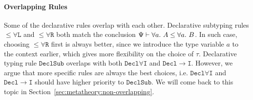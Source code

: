 \paragraph{Overlapping Rules}
Some of the declarative rules overlap with each other.
Declarative subtyping rules $\mathtt{{\le}\forall L}$ and $\mathtt{{\le}\forall R}$
both match the conclusion $\Psi\vdash \all A \le \all B$.
In such case, choosing $\mathtt{{\le}\forall R}$ first is always better,
since we introduce the type variable $a$ to the context earlier,
which gives more flexibility on the choice of $\tau$.
Declarative typing rule $\mathtt{DeclSub}$ overlaps with
both $\mathtt{Decl\forall I}$ and $\mathtt{Decl\to I}$.
However, we argue that more specific rules are always the best choices,
i.e. $\mathtt{Decl\forall I}$ and $\mathtt{Decl\to I}$ should have
higher priority to $\mathtt{DeclSub}$. We will come back to this
topic in Section~\ref{sec:metatheory:non-overlapping}.
\begin{comment}
For example, $\Psi\vdash \lam x \Lto \all a\to a$ succeeds if derived from
Rule $\mathtt{Decl\forall I}$, but fails when applied to $\mathtt{DeclSub}$:
$$
\inferrule*[right={$\mathtt{Decl\forall I}$}]
	{\inferrule*[Right={$\mathtt{Decl\to I}$}]
		{\Psi,a,x:a \vdash x \Lto a}
		{\Psi,a \vdash \lam x \Lto a \to a}
	}
	{\Psi\vdash \lam x \Lto \all a \to a}
$$
$$
\inferrule*[right={$\mathtt{DeclSub}$}]
	{
		\inferrule*[right=$\mathtt{Decl\to I\To}$]
			{\Psi \vdash \blue\sigma\to \blue\tau \quad \Psi,x:\blue\sigma\vdash e \Lto \blue\tau}
			{\Psi \vdash \lam x \To \blue\sigma\to \blue\tau}\quad
		\inferrule*[Right=$\mathtt{{\le}\forall R}$]
			{\inferrule*[Right=$\mathtt{{\le}{\to}}$]
				{
					\inferrule*[Right=$?$]
						{\text{Impossible! }\blue\sigma \neq a}
						{\Psi,a \vdash a \le \blue\sigma}
					\quad \Psi,a \vdash \blue\tau \le a
				}
				{\Psi,a \vdash \blue\sigma\to \blue\tau \le a \to a}
			}
			{\Psi\vdash \blue\sigma\to \blue\tau\le \all a \to a}
	}
{\Psi\vdash \lam x \Lto \all a \to a}
$$

Rule $\mathtt{Decl\to I}$ is also better at handling higher-order types.
When the lambda-expression to be inferred has a polymorphic input type,
such as $\all a \to a$,
$\mathtt{DeclSub}$ may not derive some judgments.
For example, $\Psi,id:\all a\to a \vdash \lam[f] f~id~(f~()) \Lto (\all a\to a) \to 1$
requires the argument of the lambda-expression to be a polymorphic type,
otherwise it could not be applied to both $id$ and $()$.
If Rule $\mathtt{DeclSub}$ was chosen for derivation,
the type of its argument is restricted by Rule $\mathtt{Decl\to I\To}$,
which is not a polymorphic type.
By contrast,
Rule $\mathtt{Decl\to I}$ keeps the polymorphic argument type $\all a\to a$,
and will successfully derive the judgment.
\end{comment}

